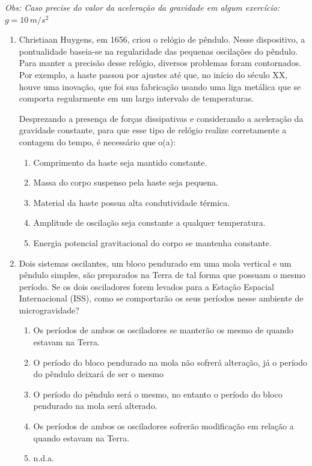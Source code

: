 \documentclass[12pt,letterpaper,fleqn]{article}
\begin{document}
\textit{Obs: Caso precise do valor da aceleração da gravidade em algum exercício: $g= 10\,m/s^2$ }
\begin{enumerate}
    \item Christiaan Huygens, em 1656, criou o relógio de pêndulo. Nesse dispositivo, a pontualidade baseia-se na regularidade das pequenas oscilações do pêndulo. Para manter a precisão desse relógio, diversos problemas foram contornados. Por exemplo, a haste passou por ajustes até que, no início do século XX, houve uma inovação, que foi sua fabricação usando uma liga metálica que se comporta regularmente em um largo intervalo de temperaturas.
    
    Desprezando a presença de forças dissipativas e considerando a aceleração da gravidade constante, para que esse tipo de relógio realize corretamente a contagem do tempo, é necessário que o(a):
    \begin{enumerate}
        \item Comprimento da haste seja mantido constante.
        \item Massa do corpo suspenso pela haste seja pequena.
        \item Material da haste possua alta condutividade térmica.
        \item Amplitude de oscilação seja constante a qualquer temperatura.
        \item Energia potencial gravitacional do corpo se mantenha constante.
    \end{enumerate}
    
    \item Dois sistemas oscilantes, um bloco pendurado em uma mola vertical e um pêndulo simples, são preparados na Terra de tal forma que possuam o mesmo período. Se os dois osciladores forem levados para a Estação Espacial Internacional (ISS), como se comportarão os seus períodos nesse ambiente de microgravidade?
    \begin{enumerate}
        \item Os períodos de ambos os osciladores se manterão os mesmo de quando estavam na Terra.
        \item O período do bloco pendurado na mola não sofrerá alteração, já o período do pêndulo deixará de ser o mesmo
        \item O período do pêndulo será o mesmo, no entanto o período do bloco pendurado na mola será alterado.
        \item Os períodos de ambos os osciladores sofrerão modificação em relação a quando estavam na Terra.
        \item n.d.a.
    \end{enumerate}
    

\end{enumerate}
\end{document}
